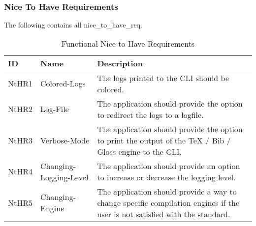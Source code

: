 \subsubsection{Nice To Have Requirements}\label{sec:nice_to_have_requirements}
The following contains all \Gls{nice_to_have_req}. 

\begin{table}[!ht]
    \centering
    \begin{tabular}{ | p{} | p{} | p{} | }
        \hline
        \textbf{ID} & \textbf{Name} & \textbf{Description} \\
        \hline
        NtHR1 & Colored-Logs & The logs printed to the CLI should be colored. \\ \hline
        NtHR2 & Log-File & The application should provide the option to redirect the logs to a logfile. \\ \hline
        NtHR3 & Verbose-Mode & The application should provide the option to print the output of the {\TeX} / Bib / Gloss engine to the CLI. \\ \hline
        NtHR4 & Changing-Logging-Level & The application should provide an option to increase or decrease the logging level. \\ \hline
        NtHR5 & Changing-Engine & The application should provide a way to change specific compilation engines if the user is not satisfied with the standard. \\ \hline
    \end{tabular}
    \caption{Functional Nice to Have Requirements}
\end{table}

